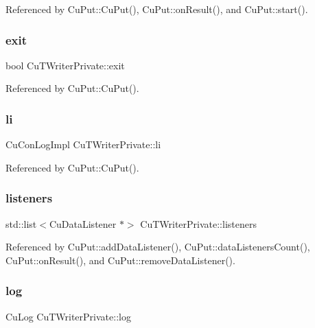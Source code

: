 Referenced by Cu\+Put\+::\+Cu\+Put(), Cu\+Put\+::on\+Result(), and Cu\+Put\+::start().

\mbox{\label{classCuTWriterPrivate_a92ca6a2bd437c76c98d687009b8c4fb7}} 
\subsubsection{exit}
{\footnotesize\ttfamily bool Cu\+T\+Writer\+Private\+::exit}



Referenced by Cu\+Put\+::\+Cu\+Put().

\mbox{\label{classCuTWriterPrivate_aca43bf794369de453e8ad37138f2b019}} 
\subsubsection{li}
{\footnotesize\ttfamily Cu\+Con\+Log\+Impl Cu\+T\+Writer\+Private\+::li}



Referenced by Cu\+Put\+::\+Cu\+Put().

\mbox{\label{classCuTWriterPrivate_a9e0909958695399c9834a67846bb3cc0}} 
\subsubsection{listeners}
{\footnotesize\ttfamily std\+::list$<$Cu\+Data\+Listener $\ast$$>$ Cu\+T\+Writer\+Private\+::listeners}



Referenced by Cu\+Put\+::add\+Data\+Listener(), Cu\+Put\+::data\+Listeners\+Count(), Cu\+Put\+::on\+Result(), and Cu\+Put\+::remove\+Data\+Listener().

\mbox{\label{classCuTWriterPrivate_a7c79035782cdfa0d8bbdfa97d4b31aef}} 
\subsubsection{log}
{\footnotesize\ttfamily Cu\+Log Cu\+T\+Writer\+Private\+::log}



